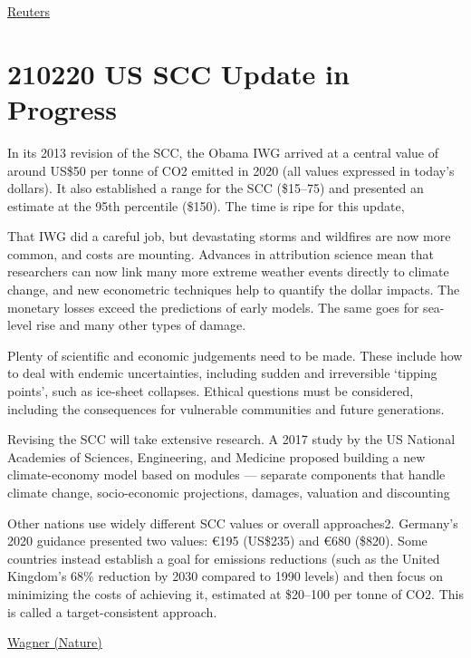 \documentclass[
]{book}
\begin{document}
\href{https://www.reuters.com/article/europe-regulations-finance/nine-eu-advisers-threaten-walkout-over-sustainable-finance-row-idUSL4N2LT4LJ}{Reuters}

\hypertarget{us-scc-update-in-progress}{%
\section{210220 US SCC Update in Progress}\label{us-scc-update-in-progress}}

In its 2013 revision of the SCC, the Obama IWG arrived at a central value of around US\$50 per tonne of CO2 emitted in 2020 (all values expressed in today's dollars). It also established a range for the SCC (\$15--75) and presented an estimate at the 95th percentile (\$150).
The time is ripe for this update,

That IWG did a careful job, but devastating storms and wildfires are now more common, and costs are mounting. Advances in attribution science mean that researchers can now link many more extreme weather events directly to climate change, and new econometric techniques help to quantify the dollar impacts. The monetary losses exceed the predictions of early models. The same goes for sea-level rise and many other types of damage.

Plenty of scientific and economic judgements need to be made. These include how to deal with endemic uncertainties, including sudden and irreversible `tipping points', such as ice-sheet collapses. Ethical questions must be considered, including the consequences for vulnerable communities and future generations.

Revising the SCC will take extensive research.
A 2017 study by the US National Academies of Sciences, Engineering, and Medicine
proposed building a new climate-economy model based on modules ---
separate components that handle
climate change, socio-economic projections, damages, valuation and discounting

Other nations use widely different SCC values or overall approaches2. Germany's 2020 guidance presented two values: €195 (US\$235) and €680 (\$820). Some countries instead establish a goal for emissions reductions (such as the United Kingdom's 68\% reduction by 2030 compared to 1990 levels) and then focus on minimizing the costs of achieving it, estimated at \$20--100 per tonne of CO2. This is called a target-consistent approach.

\href{https://www.nature.com/articles/d41586-021-00441-0}{Wagner (Nature)}
\end{document}
